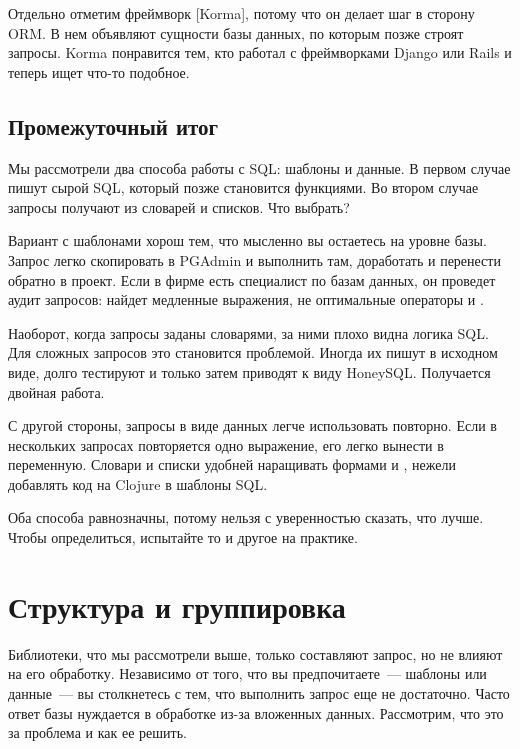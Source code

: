 \def\urlkorma{https://github.com/korma/Korma}

Отдельно отметим фреймворк \footurl{Korma}{\urlkorma}[Korma], потому что он делает шаг в сторону ORM. В нем объявляют сущности базы данных, по которым позже строят запросы. Korma понравится тем, кто работал с фреймворками Django или Rails и теперь ищет что-то подобное.

\subsection{Промежуточный итог}

Мы рассмотрели два способа работы с SQL: шаблоны и данные. В первом случае пишут сырой SQL, который позже становится функциями. Во втором случае запросы получают из словарей и списков. Что выбрать?

Вариант с шаблонами хорош тем, что мысленно вы остаетесь на уровне базы. Запрос легко скопировать в PGAdmin и выполнить там, доработать и перенести обратно в проект. Если в фирме есть специалист по базам данных, он проведет аудит запросов: найдет медленные выражения, не оптимальные операторы  и .

Наоборот, когда запросы заданы словарями, за ними плохо видна логика SQL. Для сложных запросов это становится проблемой. Иногда их пишут в исходном виде, долго тестируют и только затем приводят к виду HoneySQL. Получается двойная работа.

С другой стороны, запросы в виде данных легче использовать повторно. Если в нескольких запросах повторяется одно выражение, его легко вынести в переменную. Словари и списки удобней наращивать формами  и , нежели добавлять код на Clojure в шаблоны SQL.

Оба способа равнозначны, потому нельзя с уверенностью сказать, что лучше. Чтобы определиться, испытайте то и другое на практике.

\section{Структура и группировка}

Библиотеки, что мы рассмотрели выше, только составляют запрос, но не влияют на его обработку. Независимо от того, что вы предпочитаете~--- шаблоны или данные~--- вы столкнетесь с тем, что выполнить запрос еще не достаточно. Часто ответ базы нуждается в обработке из-за вложенных данных. Рассмотрим, что это за проблема и как ее решить.

